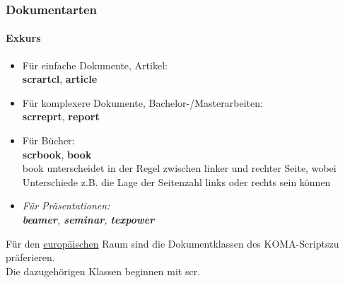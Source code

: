 \begin{frame}
\frametitle{Dokumentarten}
\framesubtitle{Exkurs}

\begin{itemize}

\item Für einfache Dokumente, Artikel:\\
\textbf{scrartcl}, \textbf{article}\\

\item Für komplexere Dokumente, Bachelor-/Masterarbeiten:\\
\textbf{scrreprt}, \textbf{report}\\

\item Für Bücher:\\
\textbf{scrbook}, \textbf{book}\\
{\ttfamily book} unterscheidet in der Regel zwischen linker und rechter Seite, wobei Unterschiede z.B. die Lage der Seitenzahl links oder rechts sein können

\item \textit{Für Präsentationen:\\
\textbf{beamer}, \textbf{seminar}, \textbf{texpower}}\\
\vspace{0.5cm}

\end{itemize}

Für den \underline{europäischen} Raum sind die Dokumentklassen des \glqq KOMA-Scripts\grqq zu präferieren.\\
Die dazugehörigen Klassen beginnen mit \glqq scr\grqq .\\
\end{frame}


